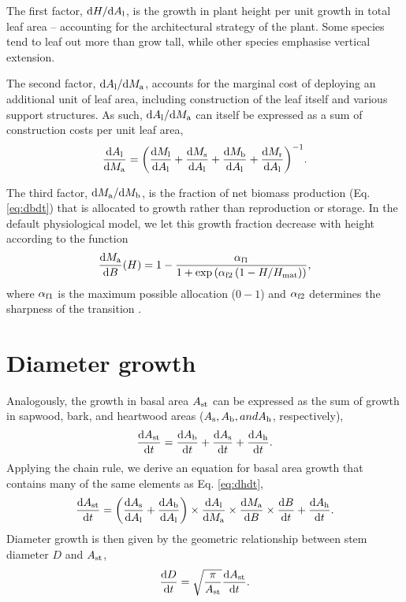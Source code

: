 \documentclass[10pt,twoside]{article}
\begin{document}
The first factor,
\({\rm d}H / {\rm d}A_{\rm l}\), is the growth in plant height
per unit growth in total leaf area -- accounting for the architectural
strategy of the plant. Some species tend to leaf out more than grow
tall, while other species emphasise vertical extension.

The second factor,
\({\rm d}A_{\rm l} / {\rm d}M_{\rm a}\), accounts for the
marginal cost of deploying an additional unit of leaf area, including
construction of the leaf itself and various support structures. As such,
\({\rm d}A_{\rm l} / {\rm d}M_{\rm a}\) can itself be
expressed as a sum of construction costs per unit leaf area,
\begin{equation}\label{eq:daldmt}
\frac{{\rm d}A_{\rm l}}{{\rm d}M_{\rm a}}
= \bigg( \frac{{\rm d}M_{\rm l}}{{\rm d}A_{\rm l}} + \frac{{\rm d}M_{\rm s}}{{\rm d}A_{\rm l}} + \frac{{\rm d}M_{\rm b}}{{\rm d}A_{\rm l}} + \frac{{\rm d}M_{\rm r}}{{\rm d}A_{\rm l}}\bigg)^{-1}.
\end{equation}

The third factor,
\({\rm d}M_{\rm a} / {\rm d}M_{\rm b}\), is the fraction
of net biomass production (Eq. \ref{eq:dbdt}) that is allocated to
growth rather than reproduction or storage. In the default physiological model,
we let this growth fraction decrease with height according to the function
\begin{equation}\label{eq:allocation}
\frac{{\rm d}M_{\rm a}}{{\rm d}B}(H) = 1 -
\frac{\alpha_{{\rm f1}}} {1 + \exp\left(\alpha_{{\rm f2}} \left(1 - H / H_{\rm mat}\right)\right)},
\end{equation}
where $\alpha_{{\rm f1}}$ is the maximum possible allocation ($0-1$) and $\alpha_{{\rm f2}}$
determines the sharpness of the transition \citep{Falster-2011}.

\section{Diameter growth}

Analogously, the growth in basal area $A_{\rm st}$ can be
expressed as the sum of growth in sapwood, bark, and heartwood areas
($A_{\rm s}, A_{\rm b}, and A_{\rm h}$, respectively),
$$\frac{{\rm d}A_{\rm st}}{{\rm d}t} = \frac{{\rm d}A_{\rm b}}{{\rm d}t} + \frac{{\rm d}A_{\rm s}}{{\rm d}t} + \frac{{\rm d}A_{\rm h}}{{\rm d}t}.$$
Applying the chain rule, we derive an equation for basal area growth that contains many of the same
elements as Eq. \ref{eq:dhdt},
\begin{equation}\label{eq:dast}
\frac{{\rm d}A_{\rm st}}{{\rm d}t} = \left(\frac{{\rm d}A_{\rm s}}{{\rm d}A_{\rm l}} + \frac{{\rm d}A_{\rm b}}{{\rm d}A_{\rm l}}\right) \times
\frac{{\rm d}A_{\rm l}}{{\rm d}M_{\rm a}} \times \frac{{\rm d}M_{\rm a}}{{\rm d}B} \times \frac{{\rm d}B}{{\rm d}t} + \frac{{\rm d}A_{\rm h}}{{\rm d}t} .
\end{equation}
Diameter growth is then given by the geometric relationship between stem
diameter $D$ and $A_{\rm st}$,
\begin{equation} \label{eq:dDdt}
\frac{{\rm d}D}{{\rm d}t} = \sqrt{\frac{\pi}{A_{\rm st}}} \frac{{\rm d}A_{\rm st}}{{\rm d}t}.
\end{equation}
\end{document}
